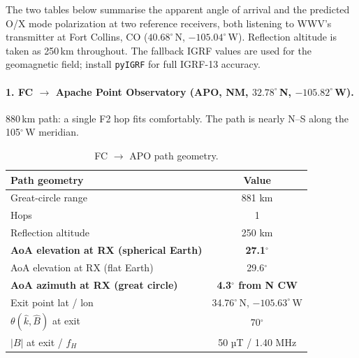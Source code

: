 \documentclass[11pt]{article}
\begin{document}
The two tables below summarise the apparent angle of arrival and
the predicted O/X mode polarization at two reference receivers, both
listening to WWV's transmitter at Fort Collins, CO ($40.68^\circ$\,N,
$-105.04^\circ$\,W).  Reflection altitude is taken as 250\,km
throughout.  The fallback IGRF values are used for the geomagnetic
field; install \texttt{pyIGRF} for full IGRF-13 accuracy.

\paragraph{1.  FC $\to$ Apache Point Observatory  (APO, NM,
$32.78^\circ$\,N, $-105.82^\circ$\,W).}
880\,km path: a single F2 hop fits comfortably.  The path is nearly
N--S along the 105$^\circ$\,W meridian.

\begin{table}[h]\centering
\begin{tabular}{lc}
\toprule
\textbf{Path geometry} & \textbf{Value} \\\midrule
Great-circle range          & 881 km          \\
Hops                        & 1               \\
Reflection altitude         & 250 km          \\
\textbf{AoA elevation at RX (spherical Earth)} & \textbf{27.1$^\circ$} \\
AoA elevation at RX (flat Earth)               & 29.6$^\circ$ \\
\textbf{AoA azimuth at RX (great circle)}      & \textbf{4.3$^\circ$ from N CW} \\
Exit point lat / lon        & 34.76$^\circ$\,N, $-105.63^\circ$\,W \\
$\theta(\hat k, \hat B)$ at exit & 70$^\circ$       \\
$|B|$ at exit / $f_H$       & 50 µT / 1.40 MHz \\\bottomrule
\end{tabular}
\caption{FC $\to$ APO path geometry.}
\end{table}
\end{document}
